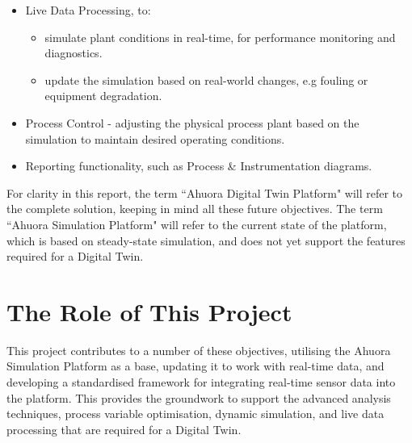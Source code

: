 \begin{itemize}
    \item Live Data Processing, to:
          \begin{itemize}
              \item simulate plant conditions in real-time, for performance monitoring and diagnostics.
              \item update the simulation based on real-world changes, e.g fouling or equipment degradation.
          \end{itemize}
    \item Process Control - adjusting the physical process plant based on the simulation to maintain desired operating conditions.
    \item Reporting functionality, such as Process \& Instrumentation diagrams.
\end{itemize}

For clarity in this report, the term ``Ahuora Digital Twin Platform" will refer to the complete solution, keeping in mind all these future objectives. The term ``Ahuora Simulation Platform" will refer to the current state of the platform, which is based on steady-state simulation, and does not yet support the features required for a Digital Twin.

\section{The Role of This Project}

This project contributes to a number of these objectives, utilising the Ahuora Simulation Platform as a base, updating it to work with real-time data, and developing a standardised framework for integrating real-time sensor data into the platform. This provides the groundwork to support the advanced analysis techniques, process variable optimisation, dynamic simulation, and live data processing that are required for a Digital Twin.
